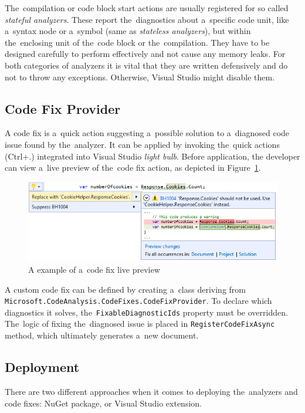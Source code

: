\documentclass[
  digital, %
  table,   %
  lof,     %
  lot,     %
  oneside,
]{fithesis3}
\begin{document}
The~compilation or code block start actions are usually registered for so called \textit{stateful analyzers}. These report the~diagnostics about a~specific code unit, like a~syntax node or a~symbol (same as \textit{stateless analyzers}), but within the~enclosing unit of the~code block or the~compilation. They have to be designed carefully to perform effectively and not cause any memory leaks. For both categories of analyzers it is vital that they are written defensively and do not to throw any exceptions. Otherwise, Visual Studio might disable them.

\subsection{Code Fix Provider}
A code fix is a~quick action suggesting a~possible solution to a~diagnosed code issue found by the~analyzer. It can be applied by invoking the~quick actions (Ctrl+.) integrated into Visual Studio \textit{light bulb}. Before application, the developer can view a~live preview of the~code fix action, as depicted in Figure~\ref{fig:codefix-example}.

\begin{figure}[h!]
		\centering
			\includegraphics[scale=0.75]{img/codefix-example}
		\caption{A example of a~code fix live preview}
		\label{fig:codefix-example}
\end{figure}

A custom code fix can be defined by creating a~class deriving from \texttt{Microsoft.CodeAnalysis.CodeFixes.CodeFixProvider}. To declare which diagnostics it solves, the~\texttt{FixableDiagnosticIds} property must be overridden. The~logic of fixing the~diagnosed issue is placed in \texttt{RegisterCodeFixAsync} method, which ultimately generates a~new document.

\newpage
\subsection{Deployment}
There are two different approaches when it comes to deploying the~analyzers and code fixes: NuGet package, or Visual Studio extension. 
\end{document}
